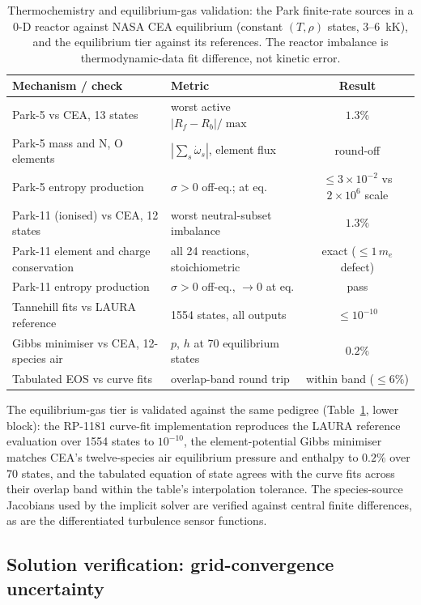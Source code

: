 \documentclass[journal,biblatex]{new-aiaa}
\begin{document}
\begin{table}[H]
\centering\footnotesize\setlength{\tabcolsep}{6pt}
\caption{Thermochemistry and equilibrium-gas validation: the Park
finite-rate sources in a 0-D reactor against NASA CEA equilibrium (constant
$(T,\rho)$ states, $3$--$6$~kK), and the equilibrium tier against its
references. The reactor imbalance is thermodynamic-data fit difference, not
kinetic error.}
\label{tab:ver-equilibrium}
\begin{tabular}{@{}llc@{}}
\toprule
Mechanism / check & Metric & Result \\
\midrule
Park-5 vs CEA, 13 states & worst active $|R_f-R_b|/\max$ & $1.3\%$ \\
Park-5 mass and N, O elements & $|\sum_s\dot\omega_s|$, element flux & round-off \\
Park-5 entropy production & $\sigma>0$ off-eq.; at eq.\ & $\le3\times10^{-2}$ vs $2\times10^{6}$ scale \\
Park-11 (ionised) vs CEA, 12 states & worst neutral-subset imbalance & $1.3\%$ \\
Park-11 element and charge conservation & all 24 reactions, stoichiometric & exact ($\le1\,m_e$ defect) \\
Park-11 entropy production & $\sigma>0$ off-eq., $\to0$ at eq. & pass \\
\midrule
Tannehill fits vs LAURA reference & 1554 states, all outputs & $\le10^{-10}$ \\
Gibbs minimiser vs CEA, 12-species air & $p$, $h$ at 70 equilibrium states & $0.2\%$ \\
Tabulated EOS vs curve fits & overlap-band round trip & within band ($\le6\%$) \\
\bottomrule
\end{tabular}
\end{table}

The equilibrium-gas tier is validated against the same pedigree (Table~\ref{tab:ver-equilibrium}, lower block): the RP-1181 curve-fit implementation reproduces the LAURA reference evaluation over 1554 states to $10^{-10}$, the element-potential Gibbs minimiser matches CEA's twelve-species air equilibrium pressure and enthalpy to $0.2\%$ over 70 states, and the tabulated equation of state agrees with the curve fits across their overlap band within the table's interpolation tolerance. The species-source Jacobians used by the implicit solver are verified against central finite differences, as are the differentiated turbulence sensor functions.

\subsection{Solution verification: grid-convergence uncertainty}
\label{sec:vv-gci}
\end{document}

